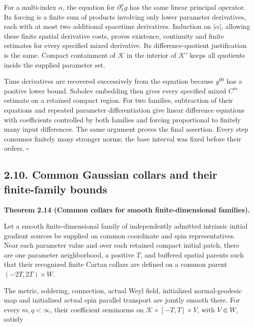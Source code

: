 \documentclass[
  english,
  11pt,
  reqno]{amsart}
\makeatletter
\newcommand{\pandocstatementheading}[1]{%
  \par\addpenalty{\@beginparpenalty}%
  \addvspace{.5\baselineskip plus .2\baselineskip minus .2\baselineskip}%
  {\normalfont\bfseries #1\par}%
  \nobreak\@afterindenttrue\@afterheading
}
\makeatother
\begin{document}
For a multi-index \(\alpha\), the equation for
\(\partial_\lambda^\alpha g\) has the same linear principal operator.
Its forcing is a finite sum of products involving only lower parameter
derivatives, each with at most two additional spacetime derivatives.
Induction on \(|\alpha|\), allowing these finite spatial derivative
costs, proves existence, continuity and finite estimates for every
specified mixed derivative. Its difference-quotient justification is the
same. Compact containment of \(\mathcal K\) in the interior of
\(\mathcal K'\) keeps all quotients inside the supplied parameter set.

Time derivatives are recovered successively from the equation because
\(g^{00}\) has a positive lower bound. Sobolev embedding then gives
every specified mixed \(C^m\) estimate on a retained compact region. For
two families, subtraction of their equations and repeated parameter
differentiation give linear difference equations with coefficients
controlled by both families and forcing proportional to finitely many
input differences. The same argument proves the final assertion. Every
step consumes finitely many stronger norms; the base interval was fixed
before their orders. \hfill\(\square\)

\subsection{2.10. Common Gaussian collars and their finite-family
bounds}\label{common-gaussian-collars-and-their-finite-family-bounds}\label{sec:online-common-collar-families}

\pandocstatementheading{\leavevmode{}\label{thm:online-common-collar-finite-families}Theorem 2.14 (Common collars for smooth finite-dimensional families).}

Let a smooth finite-dimensional family of independently admitted
intrinsic initial gradient sources be supplied on common coordinate and
spin representatives. Near each parameter value and over each retained
compact initial patch, there are one parameter neighborhood, a positive
\(T\), and buffered spatial parents such that their recognized finite
Cartan collars are defined on a common parent \((-2T,2T)\times W\).

The metric, soldering, connection, actual Weyl field, initialized
normal-geodesic map and initialized actual spin parallel transport are
jointly smooth there. For every \(m,q<\infty\), their coefficient
seminorms on \(\mathcal K\times[-T,T]\times\overline V\), with
\(V\Subset W\), satisfy
\end{document}

